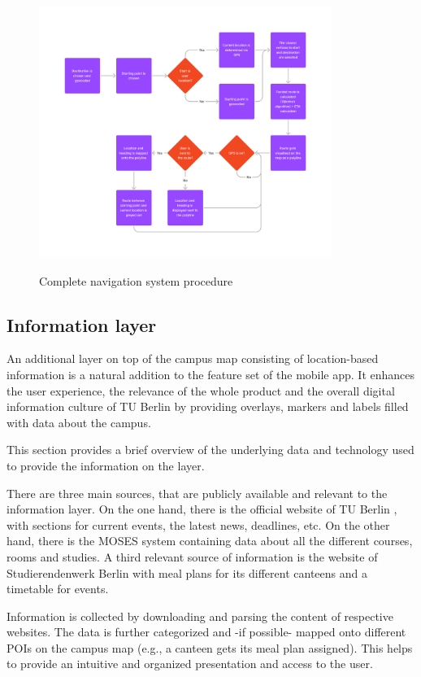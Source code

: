 \begin{figure}[!ht]
	\centering
	\includegraphics[width=0.85\textwidth]{images/navigation_process.png}\\
	\caption{Complete navigation system procedure}
\end{figure}

\subsection{Information layer}
An additional layer on top of the campus map consisting of location-based information is a natural addition to the feature set of the mobile app. It enhances the user experience, the relevance of the whole product and the overall digital information culture of TU Berlin by providing overlays, markers and labels filled with data about the campus.

This section provides a brief overview of the underlying data and technology used to provide the information on the layer.

There are three main sources, that are publicly available and relevant to the information layer. On the one hand, there is the official website of TU Berlin \cite{tu_berlin_main}, with sections for current events, the latest news, deadlines, etc. On the other hand, there is the MOSES system \cite{tu_berlin_moses} containing data about all the different courses, rooms and studies. A third relevant source of information is the website of Studierendenwerk Berlin \cite{studierendenwerk_berlin} with meal plans for its different canteens and a timetable for events.

Information is collected by downloading and parsing the content of respective websites. The data is further categorized and -if possible- mapped onto different POIs on the campus map (e.g., a canteen gets its meal plan assigned). This helps to provide an intuitive and organized presentation and access to the user.

